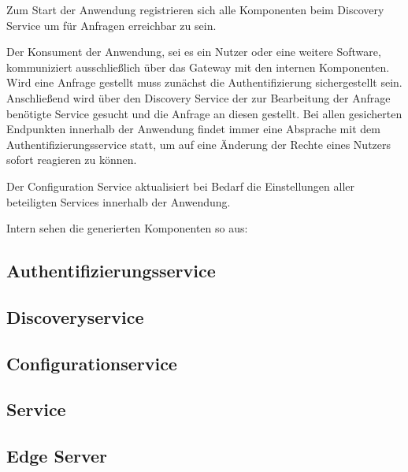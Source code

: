 \documentclass[12pt,a4paper,bibliography=totocnumbered,listof=totocnumbered]{scrartcl}
\begin{document}

Zum Start der Anwendung registrieren sich alle Komponenten beim Discovery Service um für Anfragen erreichbar zu sein.

Der Konsument der Anwendung, sei es ein Nutzer oder eine weitere Software, kommuniziert ausschließlich über das Gateway mit den internen Komponenten. Wird eine Anfrage gestellt muss zunächst die Authentifizierung sichergestellt sein. Anschließend wird über den Discovery Service der zur Bearbeitung der Anfrage benötigte Service gesucht und die Anfrage an diesen gestellt. Bei allen gesicherten Endpunkten innerhalb der Anwendung findet immer eine Absprache mit dem Authentifizierungsservice statt, um auf eine Änderung der Rechte eines Nutzers sofort reagieren zu können.

Der Configuration Service aktualisiert bei Bedarf die Einstellungen aller beteiligten Services innerhalb der Anwendung.


Intern sehen die generierten Komponenten so aus:

\subsection{Authentifizierungsservice}

\subsection{Discoveryservice}

\subsection{Configurationservice}

\subsection{Service}

\subsection{Edge Server}

\end{document}
